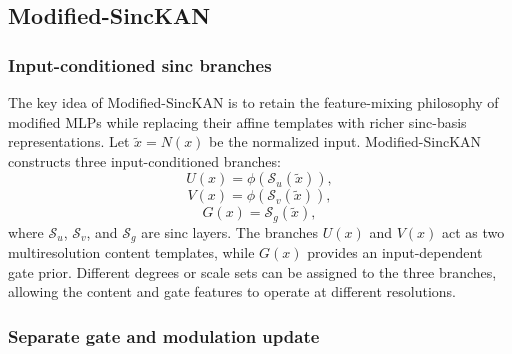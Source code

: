 \documentclass[preprint,12pt]{elsarticle}
\begin{document}
\subsection{Modified-SincKAN}

\subsubsection{Input-conditioned sinc branches}

The key idea of Modified-SincKAN is to retain the feature-mixing philosophy of modified MLPs while replacing their affine templates with richer sinc-basis representations. Let \(\tilde{x}=N(x)\) be the normalized input. Modified-SincKAN constructs three input-conditioned branches:
\begin{equation}
  U(x) = \phi(\mathcal{S}_u(\tilde{x})),
\end{equation}
\begin{equation}
  V(x) = \phi(\mathcal{S}_v(\tilde{x})),
\end{equation}
\begin{equation}
  G(x) = \mathcal{S}_g(\tilde{x}),
\end{equation}
where \(\mathcal{S}_u\), \(\mathcal{S}_v\), and \(\mathcal{S}_g\) are sinc layers. The branches \(U(x)\) and \(V(x)\) act as two multiresolution content templates, while \(G(x)\) provides an input-dependent gate prior. Different degrees or scale sets can be assigned to the three branches, allowing the content and gate features to operate at different resolutions.

\subsubsection{Separate gate and modulation update}
\end{document}
